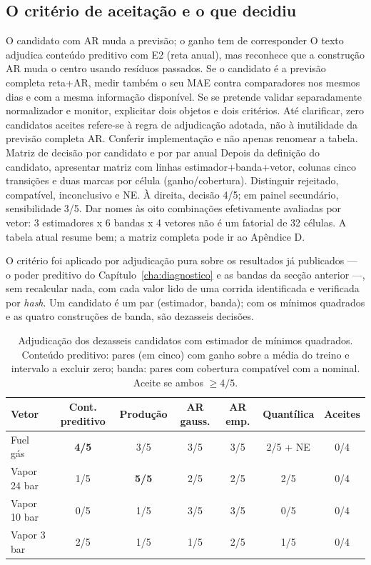 \subsection{O critério de aceitação e o que decidiu}
\label{sec:demo-gate}
{O candidato com AR muda a previsão; o ganho tem de corresponder}
{O texto adjudica conteúdo preditivo com E2 (reta anual), mas reconhece
que a construção AR muda o centro usando resíduos passados. Se o
candidato é a previsão completa reta+AR, medir também o seu MAE contra
comparadores nos mesmos dias e com a mesma informação disponível.
Se se pretende validar separadamente normalizador e monitor, explicitar
dois objetos e dois critérios. Até clarificar, zero candidatos aceites
refere-se à regra de adjudicação adotada, não à inutilidade da previsão
completa AR. Conferir implementação e não apenas renomear a tabela.}%
{Matriz de decisão por candidato e por par anual}
{Depois da definição do candidato, apresentar matriz com linhas
estimador+banda+vetor, colunas cinco transições e duas marcas por célula
(ganho/cobertura). Distinguir rejeitado, compatível, inconclusivo e NE.
À direita, decisão 4/5; em painel secundário, sensibilidade 3/5.
Dar nomes às oito combinações efetivamente avaliadas por vetor:
3 estimadores x 6 bandas x 4 vetores não é um fatorial de 32 células.
A tabela atual resume bem; a matriz completa pode ir ao Apêndice D.}%

O critério foi aplicado por adjudicação pura sobre os resultados já
publicados --- o poder preditivo do Capítulo~\ref{cha:diagnostico} e as
bandas da secção anterior ---, sem recalcular nada, com cada valor lido de
uma corrida identificada e verificada por \emph{hash}. Um candidato é um par
(estimador, banda); com os mínimos quadrados e as quatro construções de
banda, são dezasseis decisões.

\begin{table}[htbp]
  \centering
  \caption[Critério de aceitação: candidatos de mínimos quadrados]{Adjudicação
  dos dezasseis candidatos com estimador de mínimos quadrados. Conteúdo
  preditivo: pares (em cinco) com ganho sobre a média do treino e intervalo a
  excluir zero; banda: pares com cobertura compatível com a nominal. Aceite
  se ambos $\geq 4/5$.}
  \label{tab:gate}
  \small
  \begin{tabular}{lcccccc}
    \toprule
    Vetor & Cont. preditivo & Produção & AR gauss. & AR emp. & Quantílica & Aceites \\
    \midrule
    Fuel gás     & \textbf{4/5} & 3/5 & 3/5 & 3/5 & 2/5 + NE & 0/4 \\
    Vapor 24 bar & 1/5 & \textbf{5/5} & 2/5 & 2/5 & 2/5 & 0/4 \\
    Vapor 10 bar & 0/5 & 1/5 & 3/5 & 3/5 & 0/5 & 0/4 \\
    Vapor 3 bar  & 2/5 & 1/5 & 1/5 & 2/5 & 1/5 & 0/4 \\
    \bottomrule
  \end{tabular}
\end{table}

